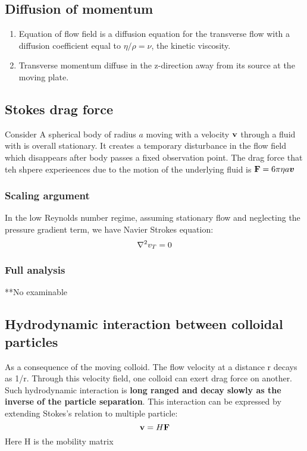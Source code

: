 \documentclass[12pt,a4paper]{article}
\begin{document}
        \subsection{Diffusion of momentum}
            \begin{enumerate}
                \item Equation of flow field is a diffusion equation for the transverse flow with a diffusion coefficient equal to $\eta/\rho=\nu$, the kinetic viscosity.
                \item Transverse momentum diffuse in the z-direction away from its source at the moving plate.
            \end{enumerate}    
        \subsection{Stokes drag force}
            Consider A spherical body of radius $a$ moving with a velocity $\vb{v}$ through a fluid with is overall stationary. It creates a temporary disturbance in the flow field which disappears after body passes a fixed observation point. The drag force that teh shpere experieences due to the motion of the underlying fluid is $\vb{F} = 6\pi \eta a \vb*{v}$
            \subsubsection{Scaling argument}
            In the low Reynolds number regime, assuming stationary flow and neglecting the pressure gradient term, we have Navier Strokes equation:
            $$
                \laplacian{v_T}=0 
            $$
            \subsubsection{Full analysis}
            **No examinable
        \subsection{Hydrodynamic interaction between colloidal particles}
            As a consequence of the moving colloid. The flow velocity at a distance r decays as 1/r. Through this velocity field, one colloid can exert drag force on another. Such hydrodynamic interaction is \textbf{long ranged and decay slowly as the inverse of the particle separation}.
            This interaction can be expressed by extending Stokes's relation to multiple particle:
            $$
                \vb{v} = H \vb{F}
            $$
            Here H is the mobility matrix
\end{document}
